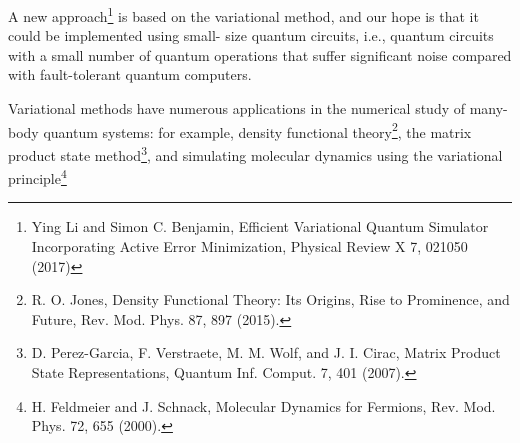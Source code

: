 \documentclass[11pt, oneside]{article}   	%
\begin{document}
A new approach\footnote{Ying Li and Simon C. Benjamin, Efficient Variational Quantum Simulator Incorporating Active Error Minimization, Physical Review X 7, 021050 (2017)} is based on the variational method, and our hope is that it could be implemented using small- size quantum circuits, i.e., quantum circuits with a small number of quantum operations that suffer significant noise compared with fault-tolerant quantum computers.

Variational methods have numerous applications in the numerical study of many-body quantum systems: for example, 
density functional theory\footnote{R. O. Jones, Density Functional Theory: Its Origins, Rise to Prominence, and Future, Rev. Mod. Phys. 87, 897 (2015).}, 
the matrix product state method\footnote{D. Perez-Garcia, F. Verstraete, M. M. Wolf, and J. I. Cirac, Matrix Product State Representations, Quantum Inf. Comput. 7, 401 (2007).}, 
and simulating molecular dynamics using the variational principle\footnote{H. Feldmeier and J. Schnack, Molecular Dynamics for
Fermions, Rev. Mod. Phys. 72, 655 (2000).}
\end{document}
